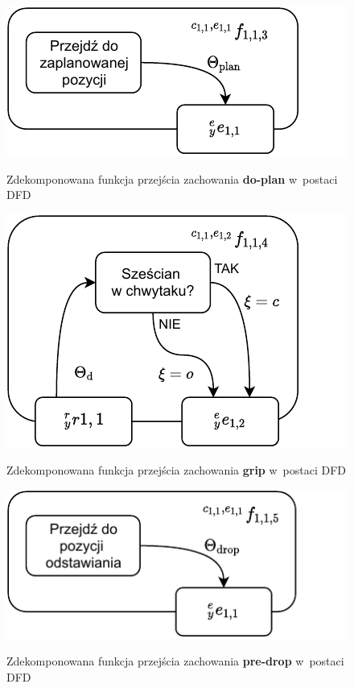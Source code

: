 \begin{figure}
    \centering
    \includegraphics[width=\columnwidth]{figures/ISR-cs-fp-do-plan.pdf}
    \label{fig:cs-fp-do-plan}
    \caption{Zdekomponowana funkcja przejścia zachowania \textbf{do-plan} w~postaci DFD}
\end{figure}

\begin{figure}
    \centering
    \includegraphics[width=\columnwidth]{figures/ISR-cs-fp-grip.pdf}
    \label{fig:cs-fp-grip}
    \caption{Zdekomponowana funkcja przejścia zachowania \textbf{grip} w~postaci DFD}
\end{figure}

\begin{figure}
    \centering
    \includegraphics[width=\columnwidth]{figures/ISR-cs-fp-pre-drop.pdf}
    \label{fig:cs-fp-pre-drop}
    \caption{Zdekomponowana funkcja przejścia zachowania \textbf{pre-drop} w~postaci DFD}
\end{figure}

